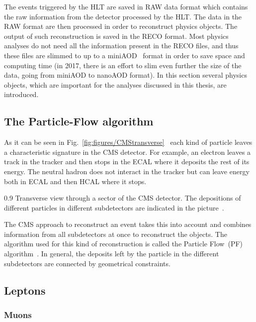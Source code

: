 The events triggered by the HLT are saved in RAW data format which contains the raw information from the detector processed by the HLT. The data in the RAW format are then processed in order to reconstruct physics objects. The output of such reconstruction is saved in the RECO format. Most physics analyses do not need all the information present in the RECO files, and thus these files are slimmed to up to a miniAOD~\cite{Petrucciani:2029414} format in order to save space and computing time (in 2017, there is an effort to slim even further the size of the data, going from miniAOD to nanoAOD format). In this section several physics objects, which are important for the analyses discussed in this thesis, are introduced.


\subsection{The Particle-Flow algorithm}

As it can be seen in Fig.~\ref{fig:figures/CMStransverse}~\cite{Sirunyan:2017ulk} each kind of particle leaves a characteristic signature in the CMS detector. For example, an electron leaves a track in the tracker and then stops in the ECAL where it deposits the rest of its energy. The neutral hadron does not interact in the tracker but can leave energy both in ECAL and then HCAL where it stops.

                 {0.9}       %
                 { Transverse view through a sector of the CMS detector. The depositions of different particles in different subdetectors are indicated in the picture~\cite{Sirunyan:2017ulk}. }

The CMS approach to reconstruct an event takes this into account and combines information from all subdetectors at once to reconstruct the objects. The algorithm used for this kind of reconstruction is called the Particle Flow~(PF) algorithm~\cite{Sirunyan:2017ulk}. In general, the deposits left by the particle in the different subdetectors are connected by geometrical constraints.


\subsection{Leptons}

\subsubsection{Muons}


